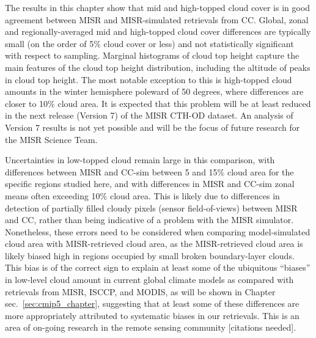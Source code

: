 The results in this chapter show that mid and high-topped cloud cover is
in good agreement between MISR and MISR-simulated retrievals from CC.
Global, zonal and regionally-averaged mid and high-topped cloud cover
differences are typically small (on the order of 5\% cloud cover or
less) and not statistically significant with respect to sampling.
Marginal histograms of cloud top height capture the main features of the
cloud top height distribution, including the altitude of peaks in cloud
top height. The most notable exception to this is high-topped cloud
amounts in the winter hemisphere poleward of 50 degrees, where
differences are closer to 10\% cloud area. It is expected that this
problem will be at least reduced in the next release (Version 7) of the
MISR CTH-OD dataset. An analysis of Version 7 results is not yet
possible and will be the focus of future research for the MISR Science
Team.

Uncertainties in low-topped cloud remain large in this comparison, with
differences between MISR and CC-sim between 5 and 15\% cloud area for
the specific regions studied here, and with differences in MISR and
CC-sim zonal means often exceeding 10\% cloud area. This is likely due
to differences in detection of partially filled cloudy pixels (sensor
field-of-views) between MISR and CC, rather than being indicative of a
problem with the MISR simulator. Nonetheless, these errors need to be
considered when comparing model-simulated cloud area with MISR-retrieved
cloud area, as the MISR-retrieved cloud area is likely biased high in
regions occupied by small broken boundary-layer clouds. This bias is of
the correct sign to explain at least some of the ubiquitous ``biases''
in low-level cloud amount in current global climate models as compared
with retrievals from MISR, ISCCP, and MODIS, as will be shown in Chapter
sec.~\ref{sec:cmip5_chapter}, suggesting that at least some of these
differences are more appropriately attributed to systematic biases in
our retrievals. This is an area of on-going research in the remote
sensing community {[}citations needed{]}.

